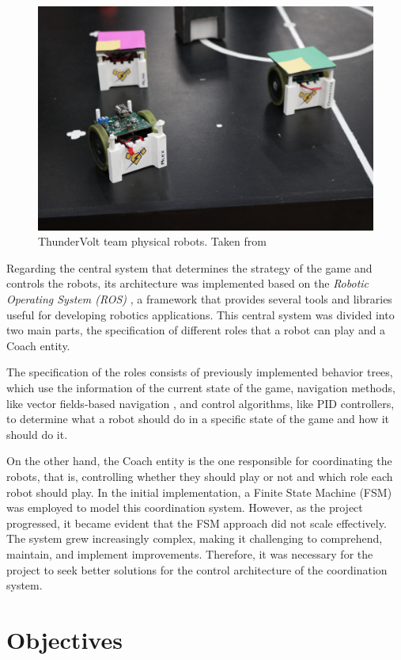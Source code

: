 \begin{figure}[!ht]
    \centering
    \includegraphics[width=.6\linewidth]{images/ThunderVolt Robots.jpeg}
    \caption{ThunderVolt team physical robots. Taken from \cite{ThunderVolt}}
    \label{fig:physical_robots}
\end{figure}

Regarding the central system that determines the strategy of the game and controls the robots, its architecture was implemented based on the \textit{Robotic Operating System (ROS)} \cite{ROS}, a framework that provides several tools and libraries useful for developing robotics applications. This central system was divided into two main parts, the specification of different roles that a robot can play and a Coach entity. 

The specification of the roles consists of previously implemented behavior trees, which use the information of the current state of the game, navigation methods, like vector fields-based navigation \cite{VectorFields}, and control algorithms, like PID controllers, to determine what a robot should do in a specific state of the game and how it should do it. 

On the other hand, the Coach entity is the one responsible for coordinating the robots, that is, controlling whether they should play or not and which role each robot should play. In the initial implementation, a Finite State Machine (FSM) was employed to model this coordination system. However, as the project progressed, it became evident that the FSM approach did not scale effectively. The system grew increasingly complex, making it challenging to comprehend, maintain, and implement improvements. Therefore, it was necessary for the project to seek better solutions for the control architecture of the coordination system.

\section{Objectives}

